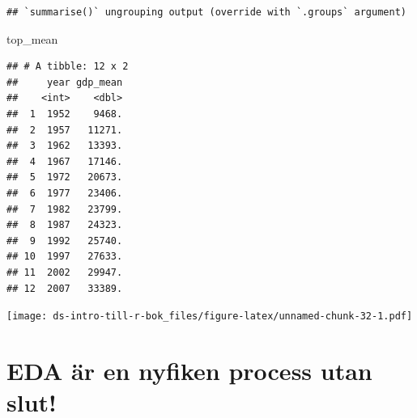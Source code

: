 \documentclass[
]{book}
\newenvironment{Shaded}{\begin{snugshade}}{\end{snugshade}}
\newcommand{\AttributeTok}[1]{\textcolor[rgb]{0.77,0.63,0.00}{#1}}
\newcommand{\FunctionTok}[1]{\textcolor[rgb]{0.00,0.00,0.00}{#1}}
\newcommand{\NormalTok}[1]{#1}
\newcommand{\OtherTok}[1]{\textcolor[rgb]{0.56,0.35,0.01}{#1}}
\newcommand{\SpecialCharTok}[1]{\textcolor[rgb]{0.00,0.00,0.00}{#1}}
\newcommand{\StringTok}[1]{\textcolor[rgb]{0.31,0.60,0.02}{#1}}
\begin{document}
\begin{verbatim}
## `summarise()` ungrouping output (override with `.groups` argument)
\end{verbatim}

\begin{Shaded}
\begin{Highlighting}[]
\NormalTok{top\_mean}
\end{Highlighting}
\end{Shaded}

\begin{verbatim}
## # A tibble: 12 x 2
##     year gdp_mean
##    <int>    <dbl>
##  1  1952    9468.
##  2  1957   11271.
##  3  1962   13393.
##  4  1967   17146.
##  5  1972   20673.
##  6  1977   23406.
##  7  1982   23799.
##  8  1987   24323.
##  9  1992   25740.
## 10  1997   27633.
## 11  2002   29947.
## 12  2007   33389.
\end{verbatim}

\begin{Shaded}
\end{Shaded}

\texttt{[image: ds-intro-till-r-bok\_files/figure-latex/unnamed-chunk-32-1.pdf]}

\hypertarget{eda-uxe4r-en-nyfiken-process-utan-slut}{%
\section{EDA är en nyfiken process utan slut!}\label{eda-uxe4r-en-nyfiken-process-utan-slut}}
\end{document}

